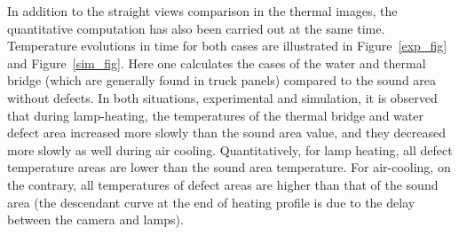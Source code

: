 \documentclass{tQRT2e}
\begin{document}
In addition to the straight views comparison in the thermal images, the quantitative computation has also been carried out at the same time. Temperature evolutions in time for both cases are illustrated in Figure~\ref{exp_fig} and Figure~\ref{sim_fig}. Here one calculates the cases of the water and thermal bridge (which are generally found in truck panels) compared to the sound area without defects. In both situations, experimental and simulation, it is observed that during lamp-heating, the temperatures of the thermal bridge and water defect area increased more slowly than the sound area value, and they decreased more slowly as well during air cooling. Quantitatively, for lamp heating, all defect temperature areas are lower than the sound area temperature. For air-cooling, on the contrary, all temperatures of defect areas are higher than that of the sound area (the descendant curve at the end of heating profile is due to the delay between the camera and lamps).  
\end{document}
